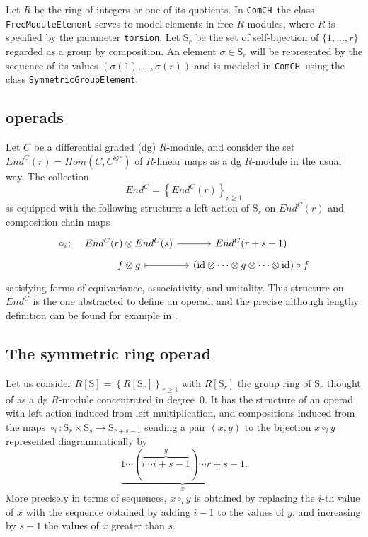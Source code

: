 \documentclass{amsart}
\renewcommand{\S}{\mathrm S}
\newcommand{\comch}{\texttt{ComCH }}
\newcommand{\id}{\mathrm{id}}
\begin{document}
Let $R$ be the ring of integers or one of its quotients. In \comch the class \texttt{FreeModuleElement} serves to model elements in free $R$-modules, where $R$ is specified by the parameter \texttt{torsion}. Let $\S_r$ be the set of self-bijection of $\{1, \dots, r\}$ regarded as a group by composition. An element $\sigma \in \S_r$ will be represented by the sequence of its values $(\sigma(1), \dots, \sigma(r))$ and is modeled in \comch using the class \texttt{SymmetricGroupElement}.

\subsection{operads}

Let $C$ be a differential graded (dg) $R$-module, and consider the set $End^C(r) = Hom(C, C^{\otimes r})$ of $R$-linear maps as a dg $R$-module in the usual way. The collection 
\begin{equation*}
End^C = \left\{End^C(r)\right\}_{r \geq 1}
\end{equation*}
ss equipped with the following structure: a left action of $\S_r$ on $End^C(r)$ and composition chain maps
\begin{equation*}
\begin{tikzcd}[column sep=small, row sep=tiny]
\circ_i \colon &[-10pt] End^C(r) \otimes End^C(s) \arrow[r] & End^C(r+s-1) \\
& f \otimes g \arrow[r, |->] & (\id \otimes \cdots \otimes g \otimes \cdots \otimes \id) \circ f 
\end{tikzcd}
\end{equation*}
satisfying forms of equivariance, associativity, and unitality. This structure on $End^C$ is the one abstracted to define an operad, and the precise although lengthy definition can be found for example in \cite{Markl08}.

\subsection{The symmetric ring operad}

Let us consider $R[\S] = \left\{R[\S_r]\right\}_{r \geq 1}$ with $R[\S_r]$ the group ring of $\S_r$ thought of as a dg $R$-module concentrated in degree~$0$. It has the structure of an operad with left action induced from left multiplication, and compositions induced from the maps $\circ_i \colon \S_r \times \S_s \to \S_{r+s-1}$ sending a pair $(x, y)$ to the bijection $x \circ_i y$ represented diagrammatically by
\begin{equation*}
\underbrace{1 \cdots (\overbrace{i \cdots i+s-1}^y) \cdots r+s-1}_x.
\end{equation*}
More precisely in terms of sequences, $x \circ_i y$ is obtained by replacing the $i$-th value of $x$ with the sequence obtained by adding $i-1$ to the values of $y$, and increasing by $s-1$ the values of $x$ greater than $s$. 
\end{document}
